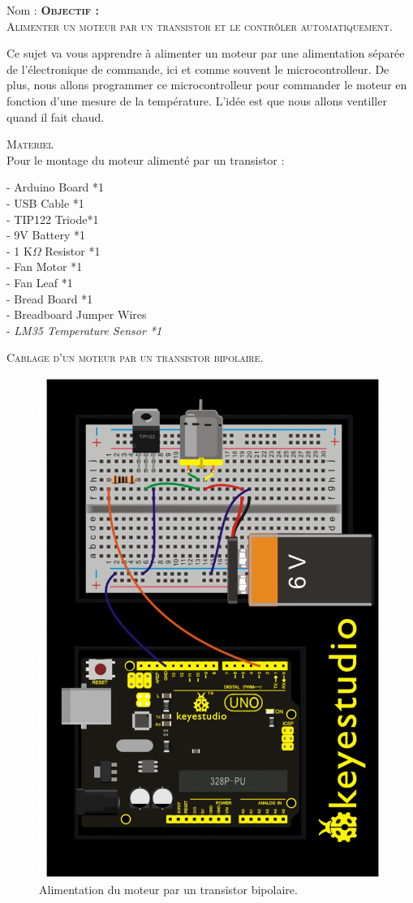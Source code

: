 \documentclass[a4paper, 11pt]{article}           %
\newcommand{\objectif}[1]{\textsc{\huge \textbf{Objectif :}\\[2mm] #1} }
\newcommand{\partie}[1]{\textsc{\Large #1} }
\begin{document}
\sffamily
\hfill Nom : {\noindent\makebox[5cm]{\dotfill}\endgraf}
\objectif{Alimenter un moteur par un transistor et le contrôler automatiquement.}

Ce sujet va vous apprendre à alimenter un moteur par une alimentation séparée de l'électronique de commande, ici et comme souvent le microcontrolleur. De plus, nous allons programmer ce microcontrolleur pour commander le moteur en fonction d'une mesure de la température. L'idée est que nous allons ventiller quand il fait chaud.

\bigskip

\partie{Materiel} \\                      %
Pour le montage du moteur alimenté par un transistor :
\begin{multicols}{2}
- Arduino Board *1 \\
- USB Cable *1 \\
- TIP122 Triode*1  \\
- 9V Battery *1  \\
- 1 K$\Omega$ Resistor *1 \\
- Fan Motor *1 \\
- Fan Leaf *1 \\
- Bread Board *1 \\
- Breadboard Jumper Wires \\
- \emph{LM35 Temperature Sensor *1}
\end{multicols}


\bigskip

\partie{Cablage d'un moteur par un transistor bipolaire.}\\             %
\begin{figure}[!b]
\begin{center}
\includegraphics[height=\textwidth, angle=270]{cablage_moteur}
\caption{Alimentation du moteur par un transistor bipolaire.}
\label{CablageMoteur}
\end{center}
\end{figure}
\end{document}
